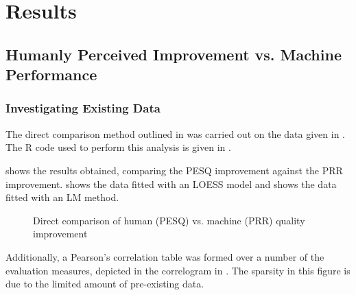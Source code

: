 
\chapter{Results}

\acresetall


\section{Humanly Perceived Improvement vs. Machine Performance}


\subsection{Investigating Existing Data}

The direct comparison method outlined in 
was carried out on the data given in  \textit{}.
The R code used to perform this analysis is given in .

 shows the results obtained, comparing the
\ac{PESQ} improvement against the \ac{PRR} improvement. 
shows the data fitted with an \ac{LOESS} model and 
shows the data fitted with an \ac{LM} method.

\begin{figure}[p]

\protect\caption{\label{fig:Direct-PESQ-PRR}Direct comparison of human (\acs{PESQ})
vs. machine (\acs{PRR}) quality improvement}
\end{figure}


Additionally, a Pearson's correlation table was formed over a number
of the evaluation measures, depicted in the correlogram in .
The sparsity in this figure is due to the limited amount of pre-existing
data.

